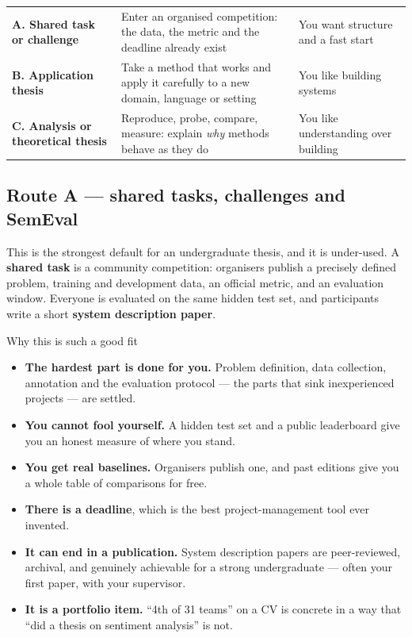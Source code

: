 \documentclass[11pt,a4paper]{article}
\begin{document}
\begin{center}
\small
\begin{tabularx}{\textwidth}{L{3.0cm} X L{3.6cm}}
\toprule
{} &  &  \\
\midrule
{}
\textbf{A. Shared task or challenge} & Enter an organised competition: the
data, the metric and the deadline already exist & You want structure and a
fast start \\
\textbf{B. Application thesis} & Take a method that works and apply it
carefully to a new domain, language or setting & You like building systems \\
\textbf{C. Analysis or theoretical thesis} & Reproduce, probe, compare,
measure: explain \emph{why} methods behave as they do & You like understanding
over building \\
\bottomrule
\end{tabularx}
\end{center}

\subsection{Route A --- shared tasks, challenges and SemEval}
\label{sec:sharedtasks}

This is the strongest default for an undergraduate thesis, and it is
under-used. A \textbf{shared task} is a community competition: organisers
publish a precisely defined problem, training and development data, an official
metric, and an evaluation window. Everyone is evaluated on the same hidden test
set, and participants write a short \textbf{system description paper}.

\begin{cbox}{Why this is such a good fit}
\begin{itemize}
  \item \textbf{The hardest part is done for you.} Problem definition, data
        collection, annotation and the evaluation protocol --- the parts that
        sink inexperienced projects --- are settled.
  \item \textbf{You cannot fool yourself.} A hidden test set and a public
        leaderboard give you an honest measure of where you stand.
  \item \textbf{You get real baselines.} Organisers publish one, and past
        editions give you a whole table of comparisons for free.
  \item \textbf{There is a deadline}, which is the best project-management tool
        ever invented.
  \item \textbf{It can end in a publication.} System description papers are
        peer-reviewed, archival, and genuinely achievable for a strong
        undergraduate --- often your first paper, with your supervisor.
  \item \textbf{It is a portfolio item.} ``4th of 31 teams'' on a CV is
        concrete in a way that ``did a thesis on sentiment analysis'' is not.
\end{itemize}
\end{cbox}
\end{document}
